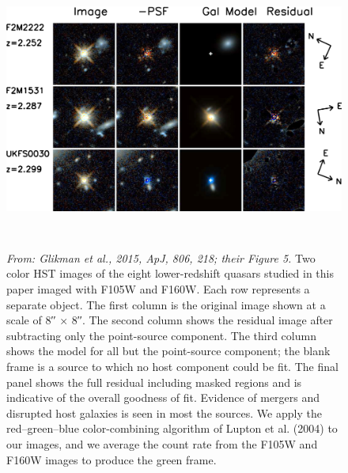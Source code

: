\documentclass[11pt,epsf]{article}
\begin{document}
\begin{figure}[h]
  \begin{center}
   \hspace{-0.5cm}
    \includegraphics[height=8.5cm,width=16.2cm]
   {figs/Glikman_2015_ApJ_806_218_Fig5_hr.jpg}
   \caption{     \footnotesize
     {\it From: Glikman et al., 2015, ApJ, 806, 218; their Figure 5.}
     Two color HST images of the eight lower-redshift quasars studied in
     this paper imaged with F105W and F160W. Each row represents a separate
     object. The first column is the original image shown at a scale of 8′′
     × 8′′. The second column shows the residual image after subtracting
     only the point-source component. The third column shows the model for
     all but the point-source component; the blank frame is a source to
     which no host component could be fit. The final panel shows the full
     residual including masked regions and is indicative of the overall
     goodness of fit. Evidence of mergers and disrupted host galaxies is
     seen in most the sources. We apply the red–green–blue color-combining
     algorithm of Lupton et al. (2004) to our images, and we average the
     count rate from the F105W and F160W images to produce the green frame.
}
  \vspace{-14pt}
 \label{figtest-fig}
\end{center}
\end{figure}
\end{document}
